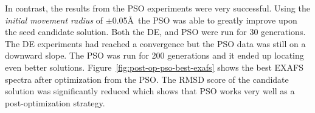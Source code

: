 In contrast, the results from the PSO experiments were very successful. Using the \textit{initial movement radius} of $\pm$0.05\AA\ the PSO was able to greatly improve upon the seed candidate solution. Both the DE, and PSO were run for 30 generations. The DE experiments had reached a convergence but the PSO data was still on a downward slope. The PSO was run for 200 generations and it ended up locating even better solutions. Figure~\ref{fig:post-op-pso-best-exafs} shows the best EXAFS spectra after optimization from the PSO. The RMSD score of the candidate solution was significantly reduced which shows that PSO works very well as a post-optimization strategy. 

\begin{figure*}
	\centering
	\caption{OEC EXAFS Spectra Comparison}
	\label{fig:post-op-pso-best-exafs}
\end{figure*}